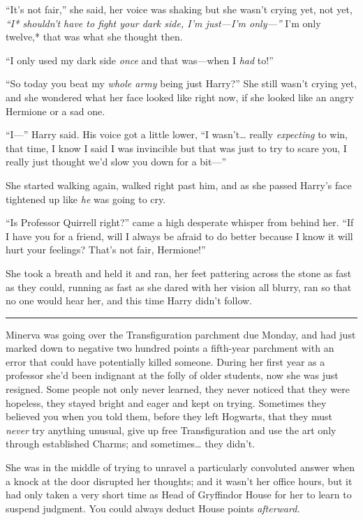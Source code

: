 ``It's not fair,'' she said, her voice was shaking but she wasn't crying
yet, not yet, \emph{``I* shouldn't have to fight your dark side, I'm
just---I'm only---'' }I'm only twelve,* that was what she thought then.

``I only used my dark side \emph{once} and that was---when I \emph{had}
to!''

``So today you beat my \emph{whole army} being just Harry?'' She still
wasn't crying yet, and she wondered what her face looked like right now,
if she looked like an angry Hermione or a sad one.

``I---'' Harry said. His voice got a little lower, ``I wasn't\ldots{}
really \emph{expecting} to win, that time, I know I said I was
invincible but that was just to try to scare you, I really just thought
we'd slow you down for a bit---''

She started walking again, walked right past him, and as she passed
Harry's face tightened up like \emph{he} was going to cry.

``Is Professor Quirrell right?'' came a high desperate whisper from
behind her. ``If I have you for a friend, will I always be afraid to do
better because I know it will hurt your feelings? That's not fair,
Hermione!''

She took a breath and held it and ran, her feet pattering across the
stone as fast as they could, running as fast as she dared with her
vision all blurry, ran so that no one would hear her, and this time
Harry didn't follow.

\begin{center}\rule{3in}{0.4pt}\end{center}

Minerva was going over the Transfiguration parchment due Monday, and had
just marked down to negative two hundred points a fifth-year parchment
with an error that could have potentially killed someone. During her
first year as a professor she'd been indignant at the folly of older
students, now she was just resigned. Some people not only never learned,
they never noticed that they were hopeless, they stayed bright and eager
and kept on trying. Sometimes they believed you when you told them,
before they left Hogwarts, that they must \emph{never} try anything
unusual, give up free Transfiguration and use the art only through
established Charms; and sometimes\ldots{} they didn't.

She was in the middle of trying to unravel a particularly convoluted
answer when a knock at the door disrupted her thoughts; and it wasn't
her office hours, but it had only taken a very short time as Head of
Gryffindor House for her to learn to suspend judgment. You could always
deduct House points \emph{afterward.}

